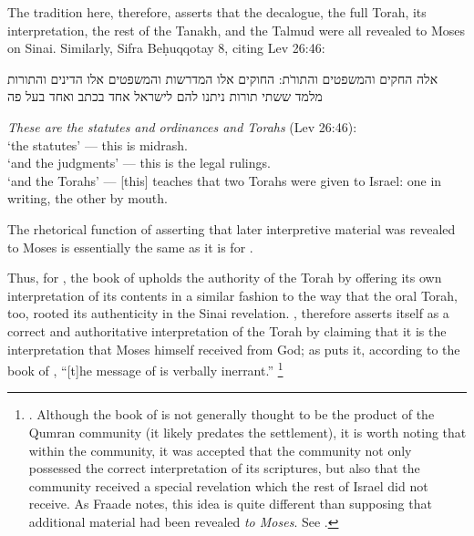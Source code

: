 \noindent
The tradition here, therefore, asserts that the decalogue, the full Torah, its interpretation, the rest of the Tanakh, and the Talmud were all revealed to Moses on Sinai. Similarly, Sifra Beḥuqqotay 8, citing Lev 26:46:
\begin{aramaictext}
    אלה החקים והמשפטים והתורֹת: החוקים אלו המדרשות והמשפטים אלו הדינים והתורות מלמד ששתי תורות ניתנו להם לישראל אחד בכתב ואחד בעל פה
\end{aramaictext}
\begin{translation}
    \emph{These are the statutes and ordinances and Torahs} (Lev 26:46):\\
    \-\hspace{2em} `the statutes' --- this is midrash.\\
    \-\hspace{2em} `and the judgments' --- this is the legal rulings.\\
    \-\hspace{2em} `and the Torahs' --- [this] teaches that two Torahs were given to Israel: one in writing, the other by mouth.
\end{translation}

\noindent
The rhetorical function of asserting that later interpretive material was revealed to Moses is essentially the same as it is for \jub.

Thus, for \vanderkam, the book of \jub upholds the authority of the Torah by offering its own interpretation of its contents in a similar fashion to the way that the oral Torah, too, rooted its authenticity in the Sinai revelation. \jub, therefore asserts itself as a correct and authoritative interpretation of the Torah by claiming that it is the interpretation that Moses himself received from God; as \vanderkam puts it, according to the book of \jub, ``[t]he message of \jub is verbally inerrant.''%
    \footnote{
        \cite[33]{vanderkam_metso-etal2010}.
        Although the book of \jub is not generally thought to be the product of the Qumran community (it likely predates the settlement), it is worth noting that within the community, it was accepted that the community not only possessed the correct interpretation of its scriptures, but also that the community received a special revelation which the rest of Israel did not receive. As Fraade notes, this idea is quite different than supposing that additional material had been revealed \emph{to Moses}. See 
        \cite[67]{fraade_jjs1993}.}

